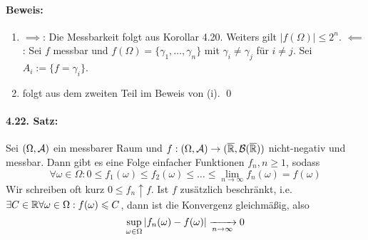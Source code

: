 \paragraph{Beweis:}
\begin{enumerate}[label=(\roman*)]
    \item $\implies$: Die Messbarkeit folgt aus Korollar 4.20. Weiters gilt $|f(\Omega)|\leq2^n$.\newline
    $\impliedby$: Sei $f$ messbar und $f(\Omega)=\{\gamma_1,\hdots,\gamma_n\}$ mit $\gamma_i\neq\gamma_j$ f\"ur $i\neq j$. Sei $A_i:=\{f=\gamma_i\}$.
    \item folgt aus dem zweiten Teil im Beweis von (i). \qed
\end{enumerate}
 
 \paragraph{4.22. Satz:}Sei $(\Omega,\mathcal{A})$ ein messbarer Raum und $f:(\Omega,\mathcal{A})\to(\overline{\mathbb{R}},\mathcal{B}(\overline{\mathbb{R}}))$ nicht-negativ und messbar. Dann gibt es eine Folge einfacher Funktionen $f_n,n\geq1$, sodass
 $$\forall\omega\in\Omega:0\leq f_1(\omega)\leq f_2(\omega)\leq\hdots\leq \lim_{n\to\infty}f_n(\omega)=f(\omega)$$
 Wir schreiben oft kurz $0\leq f_n\uparrow f$. Ist $f$ zus\"atzlich beschr\"ankt, i.e. $\exists C\in\mathbb{R}\forall\omega\in\Omega:f(\omega)\leqslant C$, dann ist die Konvergenz gleichm\"a\ss{}ig, also
 $$\sup_{\omega\in\Omega}\left|f_n(\omega)-f(\omega)\right|\nto{}{n\to\infty}0$$
 
